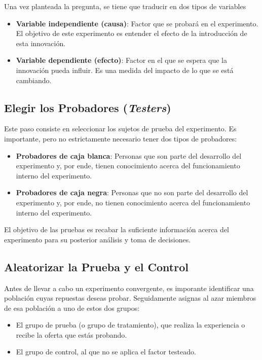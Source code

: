 Una vez planteada la pregunta, se tiene que traducir en dos tipos de variables

\begin{itemize}
	\item \textbf{Variable independiente (causa)}: Factor que se probará en el
	      experimento. El objetivo de este experimento es entender el efecto de la
	      introducción de esta innovación.

	\item \textbf{Variable dependiente (efecto)}: Factor en el que se espera que
	      la innovación pueda influir. Es una medida del impacto de lo que se está
	      cambiando.
\end{itemize}

\subsection{Elegir los Probadores (\textit{Testers})}

Este paso consiste en seleccionar los sujetos de prueba del experimento.
Es importante, pero no estrictamente necesario tener dos tipos de probadores:

\begin{itemize}
	\item \textbf{Probadores de caja blanca}: Personas que son parte del
	      desarrollo del experimento y, por ende, tienen conocimiento acerca del
	      funcionamiento interno del experimento.

	\item \textbf{Probadores de caja negra}: Personas que no son parte del
	      desarrollo del experimento y, por ende, no tienen conocimiento acerca del
	      funcionamiento interno del experimento.
\end{itemize}


El objetivo de las pruebas es recabar la suficiente información acerca del
experimento para su posterior análisis y toma de decisiones.

\subsection{Aleatorizar la Prueba y el Control}

Antes de llevar a cabo un experimento convergente, es imporante identificar una
población cuyas repuestas deseas probar. Seguidamente asignas al azar miembros
de esa población a uno de estos dos grupos:

\begin{itemize}
	\item El grupo de prueba (o grupo de tratamiento), que realiza la experiencia
	      o recibe la oferta que estás probando.

	\item El grupo de control, al que no se aplica el factor testeado.
\end{itemize}


